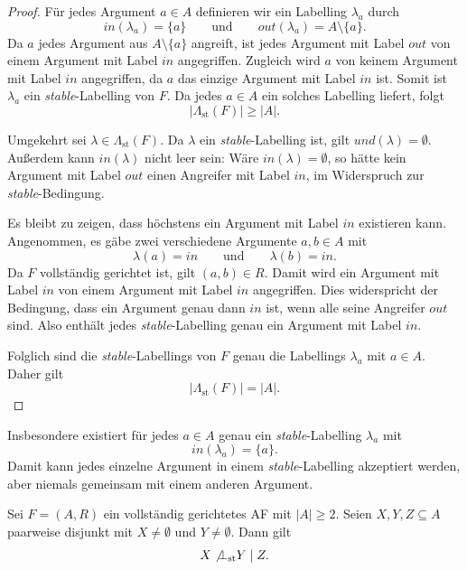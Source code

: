 \begin{proof}
    Für jedes Argument \(a\in A\) definieren wir ein Labelling \(\lambda_a\)
    durch
    \[
        \mathit{in}(\lambda_a)=\{a\}
        \qquad\text{und}\qquad
        \mathit{out}(\lambda_a)=A\setminus\{a\}.
    \]
    Da \(a\) jedes Argument aus \(A\setminus\{a\}\) angreift, ist jedes
    Argument mit Label \(\mathit{out}\) von einem Argument mit Label
    \(\mathit{in}\) angegriffen. Zugleich wird \(a\) von keinem Argument mit
    Label \(\mathit{in}\) angegriffen, da \(a\) das einzige Argument mit Label
    \(\mathit{in}\) ist. Somit ist \(\lambda_a\) ein
    \textit{stable}-Labelling von \(F\). Da jedes \(a\in A\) ein solches
    Labelling liefert, folgt
    \[
        |\Lambda_{\mathrm{st}}(F)|\geq |A|.
    \]

    Umgekehrt sei \(\lambda\in\Lambda_{\mathrm{st}}(F)\). Da
    \(\lambda\) ein \textit{stable}-Labelling ist, gilt
    \(\mathit{und}(\lambda)=\emptyset\). Außerdem kann
    \(\mathit{in}(\lambda)\) nicht leer sein: Wäre
    \(\mathit{in}(\lambda)=\emptyset\), so hätte kein Argument mit Label
    \(\mathit{out}\) einen Angreifer mit Label \(\mathit{in}\), im Widerspruch
    zur \textit{stable}-Bedingung.

    Es bleibt zu zeigen, dass höchstens ein Argument mit Label
    \(\mathit{in}\) existieren kann. Angenommen, es gäbe zwei verschiedene
    Argumente \(a,b\in A\) mit
    \[
        \lambda(a)=\mathit{in}
        \qquad\text{und}\qquad
        \lambda(b)=\mathit{in}.
    \]
    Da \(F\) vollständig gerichtet ist, gilt \((a,b)\in R\). Damit wird ein
    Argument mit Label \(\mathit{in}\) von einem Argument mit Label
    \(\mathit{in}\) angegriffen. Dies widerspricht der Bedingung, dass ein
    Argument genau dann \(\mathit{in}\) ist, wenn alle seine Angreifer
    \(\mathit{out}\) sind. Also enthält jedes \textit{stable}-Labelling genau
    ein Argument mit Label \(\mathit{in}\).

    Folglich sind die \textit{stable}-Labellings von \(F\) genau die
    Labellings \(\lambda_a\) mit \(a\in A\). Daher gilt
    \[
        |\Lambda_{\mathrm{st}}(F)|=|A|.
    \]
\end{proof}

Insbesondere existiert für jedes \(a\in A\) genau ein
\textit{stable}-Labelling \(\lambda_a\) mit
\[
    \mathit{in}(\lambda_a)=\{a\}.
\]
Damit kann jedes einzelne Argument in einem \textit{stable}-Labelling
akzeptiert werden, aber niemals gemeinsam mit einem anderen Argument.

\begin{Proposition}
    \label{prop:cdg-afs-not-st-ci}
    Sei \(F=(A,R)\) ein vollständig gerichtetes AF mit \(|A|\geq 2\).
    Seien \(X,Y,Z\subseteq A\) paarweise disjunkt mit
    \(X\neq\emptyset\) und \(Y\neq\emptyset\). Dann gilt
    \[
        X\not\bot_{\mathrm{st}}Y\mid Z.
    \]
\end{Proposition}

